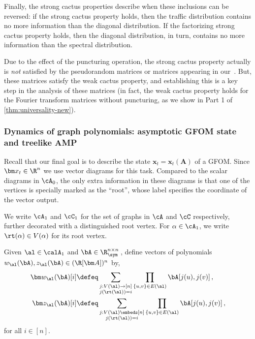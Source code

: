 Finally, the strong cactus properties describe when these inclusions can
be reversed:
if the strong cactus property holds, then the traffic distribution
contains no more information than the diagonal distribution. If the
factorizing strong cactus property holds, then the diagonal
distribution, in turn, contains no more information than the spectral
distribution.

Due to the effect of the puncturing operation, the strong cactus property actually is \emph{not} satisfied by the pseudorandom
matrices or \rrom matrices appearing in our~.
But, these matrices satisfy the weak cactus property,
and establishing this is a key step in the analysis of these matrices (in fact, the weak cactus property holds for the Fourier transform matrices without puncturing, as we show in Part 1 of \cref{thm:universality-new}).

\subsubsection{Dynamics of graph polynomials: asymptotic GFOM state and treelike AMP}

Recall that our final goal is to describe the state $\bm x_t = \bm x_t(\bm A)$ of a GFOM.
Since $\bm x_t \in \R^n$ we use vector diagrams for this task.
Compared to the scalar diagrams in $\cA_0$, the only extra information in these diagrams is that one of the vertices is specially marked as the ``root'', whose label specifies the coordinate of the vector output.

\begin{definition}
    We write $\cA_1$ and $\cC_1$ for the set of graphs in $\cA$ and $\cC$ respectively, further decorated with a distinguished root vertex.
    For $\alpha \in \cA_1$, we write $\rt(\alpha) \in V(\alpha)$ for its root vertex.
\end{definition}

\begin{definition}
        Given $\al \in \calA_1$ and $\bA \in \R^{n \times n}_{\sym}$\,, define vectors of polynomials $w_\al(\bA), z_\al(\bA) \in (\R[\bm A])^n$ by,
    \begin{align*}
        \bm w_\al(\bA)[i] &\defeq \sum_{\substack{j: V(\al) \to [n] \\ j(\rt(\al)) = i}} \prod_{\{u,v\} \in E(\al)} \bA[j(u),j(v)]\,,\\
        \bm z_\al(\bA)[i] &\defeq \sum_{\substack{j: V(\al) \embeds [n] \\ j(\rt(\al)) = i}} \prod_{\{u,v\} \in E(\al)} \bA[j(u),j(v)]\,,
    \end{align*}
    for all $i\in [n]$.
\end{definition}

